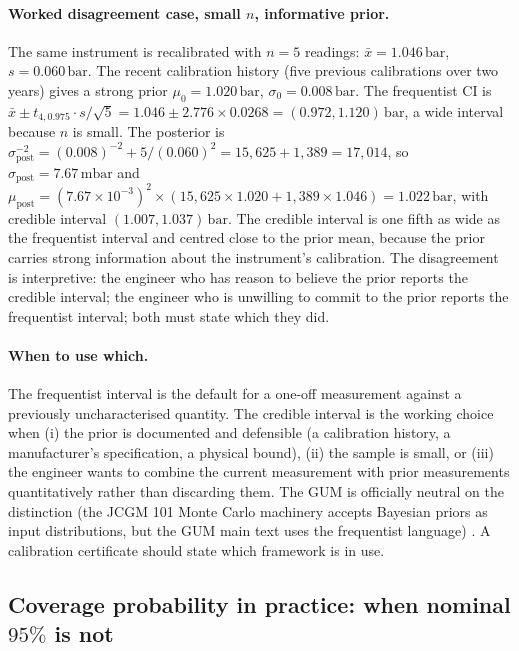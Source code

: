 \paragraph{Worked disagreement case, small $n$, informative
prior.} The same instrument is recalibrated with $n = 5$
readings: $\bar{x} = 1.046\,\si{\bar}$, $s = 0.060\,\si{\bar}$.
The recent calibration history (five previous calibrations over
two years) gives a strong prior $\mu_{0} = 1.020\,\si{\bar}$,
$\sigma_{0} = 0.008\,\si{\bar}$. The frequentist CI is
$\bar{x} \pm t_{4,0.975} \cdot s/\sqrt{5} = 1.046 \pm 2.776
\times 0.0268 = (0.972, 1.120)\,\si{\bar}$, a wide interval
because $n$ is small. The posterior is
$\sigma_{\text{post}}^{-2} = (0.008)^{-2} + 5/(0.060)^{2}
= 15{,}625 + 1{,}389 = 17{,}014$, so $\sigma_{\text{post}} =
7.67\,\si{\milli\bar}$ and
$\mu_{\text{post}} = (7.67 \times 10^{-3})^{2} \times (15{,}625
\times 1.020 + 1{,}389 \times 1.046) = 1.022\,\si{\bar}$, with
credible interval $(1.007, 1.037)\,\si{\bar}$. The credible
interval is one fifth as wide as the frequentist interval and
centred close to the prior mean, because the prior carries
strong information about the instrument's calibration. The
disagreement is interpretive: the engineer who has reason to
believe the prior reports the credible interval; the engineer
who is unwilling to commit to the prior reports the frequentist
interval; both must state which they did.

\paragraph{When to use which.} The frequentist interval is the
default for a one-off measurement against a previously
uncharacterised quantity. The credible interval is the
working choice when (i) the prior is documented and defensible
(a calibration history, a manufacturer's specification, a
physical bound), (ii) the sample is small, or (iii) the
engineer wants to combine the current measurement with prior
measurements quantitatively rather than discarding them. The
GUM is officially neutral on the distinction (the JCGM 101
Monte Carlo machinery accepts Bayesian priors as input
distributions, but the GUM main text uses the frequentist
language) \cite{std:jcgm-101}. A calibration certificate
should state which framework is in use.

\subsection{Coverage probability in practice: when nominal
$95\%$ is not}

